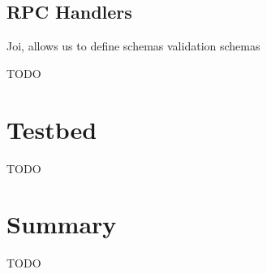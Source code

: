 \subsection{RPC Handlers}\label{subsec:rpc-handlers}

Joi, allows us to define schemas validation schemas  

TODO


\section{Testbed}\label{testbed}

TODO

\section{Summary}\label{summary}

TODO
